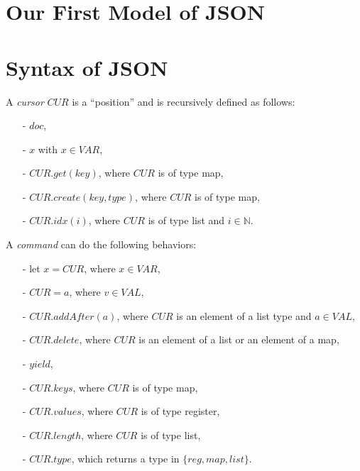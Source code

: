 
\section{Our First Model of JSON}
\label{sec:our first model of json}



\section{Syntax of JSON}
\label{sec:syntax of json}

A \emph{cursor} $CUR$ is a ``position'' and is recursively defined as follows:

\begin{itemize}
\setlength{\itemsep}{0.5pt}
\item[-] $doc$,

\item[-] $x$ with $x \in VAR$, 

\item[-] $CUR.get(key)$, where $CUR$ is of type map,  

\item[-] $CUR.create(key, type)$, where $CUR$ is of type map, 

\item[-] $CUR.idx(i)$, where $CUR$ is of type list and $i \in \mathbb{N}$. 
\end{itemize}

A \emph{command} can do the following behaviors:

\begin{itemize}
\setlength{\itemsep}{0.5pt}
\item[-] let $x = CUR$, where $x \in VAR$,

\item[-] $CUR = a$, where $v \in VAL$,

\item[-] $CUR.addAfter(a)$, where $CUR$ is an element of a list type and $a \in VAL$,

\item[-] $CUR.delete$, where $CUR$ is an element of a list or an element of a map,  

\item[-] $yield$,

\item[-] $CUR.keys$, where $CUR$ is of type map, 

\item[-] $CUR.values$, where $CUR$ is of type register, 

\item[-] $CUR.length$, where $CUR$ is of type list, 

\item[-] $CUR.type$, which returns a type in $\{ \mathit{reg}, \mathit{map}, \mathit{list} \}$. 
\end{itemize}

